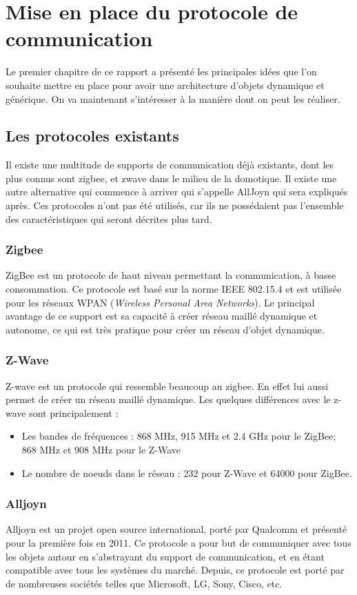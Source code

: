 ﻿\chapter{Mise en place du protocole de communication}
	Le premier chapitre de ce rapport a présenté les principales idées que l'on souhaite mettre en 
	place pour avoir une architecture d'objets dynamique et générique. On va maintenant s'intéresser
	à la manière dont on peut les réaliser.


\section{Les protocoles existants}
	Il existe une multitude de supports de communication déjà existants, dont les plus connus sont 
zigbee, et zwave dans le milieu de la domotique. Il existe une autre alternative qui commence à arriver qui s'appelle AllJoyn qui sera expliqués après. Ces protocoles n'ont pas été utilisés, car ils ne possédaient pas l'ensemble des caractéristiques qui seront décrites plus tard. 

	\subsection{Zigbee}
	ZigBee est un protocole de haut niveau permettant la communication, à basse consommation. Ce protocole est basé sur la norme IEEE 802.15.4 et est utilisée pour les réseaux WPAN (\emph{Wireless Personal 
Area Networks}). Le principal avantage de ce support est sa capacité à créer réseau maillé dynamique et autonome, ce qui est très pratique pour créer un réseau d'objet dynamique.

	\subsection{Z-Wave}
	Z-wave est un protocole qui ressemble beaucoup au zigbee. En effet lui aussi permet de créer un réseau maillé dynamique. Les quelques différences avec le z-wave sont principalement :

\begin{itemize}
 \item Les bandes de fréquences : 868 MHz, 915 MHz et 2.4 GHz pour le ZigBee; 868 MHz et 908 MHz pour le 
Z-Wave
\item Le nombre de noeuds dans le réseau : 232 pour Z-Wave et 64000 pour ZigBee.
\end{itemize}

	\subsection{Alljoyn}
	Alljoyn est un projet open source international, porté par Qualcomm et présenté pour la première fois en 2011. Ce protocole a pour but de communiquer avec tous les objets autour en s'abstrayant du support de communication, et en étant compatible avec tous les systèmes du marché. Depuis, ce protocole est porté par de nombreuses sociétés telles que Microsoft, LG, Sony, Cisco, etc.

